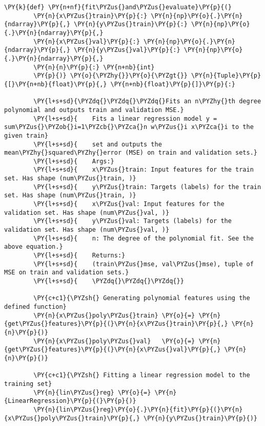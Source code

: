 \documentclass[a4paper,11pt]{article}%
\begin{document}
\begin{tcolorbox}[breakable, size=fbox, boxrule=1pt, pad at break*=1mm,colback=cellbackground, colframe=cellborder]
	\begin{Verbatim}[commandchars=\\\{\}]
		\PY{k}{def} \PY{n+nf}{fit\PYZus{}and\PYZus{}evaluate}\PY{p}{(}
		\PY{n}{x\PYZus{}train}\PY{p}{:} \PY{n}{np}\PY{o}{.}\PY{n}{ndarray}\PY{p}{,} \PY{n}{y\PYZus{}train}\PY{p}{:} \PY{n}{np}\PY{o}{.}\PY{n}{ndarray}\PY{p}{,}
		\PY{n}{x\PYZus{}val}\PY{p}{:} \PY{n}{np}\PY{o}{.}\PY{n}{ndarray}\PY{p}{,} \PY{n}{y\PYZus{}val}\PY{p}{:} \PY{n}{np}\PY{o}{.}\PY{n}{ndarray}\PY{p}{,}
		\PY{n}{n}\PY{p}{:} \PY{n+nb}{int}
		\PY{p}{)} \PY{o}{\PYZhy{}}\PY{o}{\PYZgt{}} \PY{n}{Tuple}\PY{p}{[}\PY{n+nb}{float}\PY{p}{,} \PY{n+nb}{float}\PY{p}{]}\PY{p}{:}
		
		\PY{l+s+sd}{\PYZdq{}\PYZdq{}\PYZdq{}Fits an n\PYZhy{}th degree polynomial and outputs train and validation MSE.}
		\PY{l+s+sd}{    Fits a linear regression model y = sum\PYZus{}\PYZob{}i=1\PYZcb{}\PYZca{}n w\PYZus{}i x\PYZca{}i to the given train}
		\PY{l+s+sd}{    set and outputs the mean\PYZhy{}squared\PYZhy{}error (MSE) on train and validation sets.}
		\PY{l+s+sd}{    Args:}
		\PY{l+s+sd}{    x\PYZus{}train: Input features for the train set. Has shape (num\PYZus{}train, )}
		\PY{l+s+sd}{    y\PYZus{}train: Targets (labels) for the train set. Has shape (num\PYZus{}train, )}
		\PY{l+s+sd}{    x\PYZus{}val: Input features for the validation set. Has shape (num\PYZus{}val, )}
		\PY{l+s+sd}{    y\PYZus{}val: Targets (labels) for the validation set. Has shape (num\PYZus{}val, )}
		\PY{l+s+sd}{    n: The degree of the polynomial fit. See the above equation.}
		\PY{l+s+sd}{    Returns:}
		\PY{l+s+sd}{    (train\PYZus{}mse, val\PYZus{}mse), tuple of MSE on train and validation sets.}
		\PY{l+s+sd}{    \PYZdq{}\PYZdq{}\PYZdq{}}
		
		\PY{c+c1}{\PYZsh{} Generating polynomial features using the defined function}
		\PY{n}{x\PYZus{}poly\PYZus{}train} \PY{o}{=} \PY{n}{get\PYZus{}features}\PY{p}{(}\PY{n}{x\PYZus{}train}\PY{p}{,} \PY{n}{n}\PY{p}{)}
		\PY{n}{x\PYZus{}poly\PYZus{}val}   \PY{o}{=} \PY{n}{get\PYZus{}features}\PY{p}{(}\PY{n}{x\PYZus{}val}\PY{p}{,} \PY{n}{n}\PY{p}{)}
		
		\PY{c+c1}{\PYZsh{} Fitting a linear regression model to the training set}
		\PY{n}{lin\PYZus{}reg} \PY{o}{=} \PY{n}{LinearRegression}\PY{p}{(}\PY{p}{)}
		\PY{n}{lin\PYZus{}reg}\PY{o}{.}\PY{n}{fit}\PY{p}{(}\PY{n}{x\PYZus{}poly\PYZus{}train}\PY{p}{,} \PY{n}{y\PYZus{}train}\PY{p}{)}
		

\end{Verbatim}
\end{tcolorbox}
\end{document}
